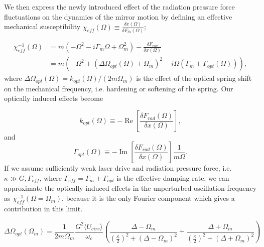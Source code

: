 We then express the newly introduced effect of the radiation pressure force fluctuations on the dynamics of the mirror motion by defining an effective mechanical susceptibility $\chi_{eff}(\Omega) \equiv \frac{\delta x(\Omega)}{\delta F_{th}(\Omega)}$;

\begin{equation}
\begin{split}
\chi_{eff}^{-1}(\Omega) & = m(-\Omega^2 -i\Gamma_m\Omega + \Omega_m^2) - \frac{\delta F_{rad}}{\delta x(\Omega)} \\
 & = m(-\Omega^2 + (\Delta\Omega_{opt}(\Omega) + \Omega_m)^2 -i\Omega(\Gamma_m + \Gamma_{opt}(\Omega))),
\end{split}
\end{equation}
\noindent
where $\Delta\Omega_{opt}(\Omega) = k_{opt}(\Omega)/(2m\Omega_m)$ is the effect of the optical spring shift on the mechanical frequency, i.e. hardening or softening of the spring. Our optically induced effects become

\begin{equation}
k_{opt}(\Omega) \equiv -\operatorname{Re}\left[{\frac{\delta F_{rad}(\Omega)}{\delta x (\Omega)}}\right],
\end{equation}
\noindent
and
\begin{equation}
\Gamma_{opt}(\Omega) \equiv -\operatorname{Im}\left[{\frac{\delta F_{rad}(\Omega)}{\delta x (\Omega)}}\right]\frac{1}{m\Omega}.
\end{equation}
\noindent
If we assume sufficiently weak laser drive and  radiation pressure force, i.e. $\kappa \gg G,\Gamma_{eff}$, where $\Gamma_{eff} = \Gamma_m + \Gamma_{opt}$ is  the effective damping rate, we can approximate the optically induced effects in the unperturbed oscillation frequency as $\chi_{eff}^{-1}(\Omega = \Omega_m)$, because it is the only Fourier component which gives a contribution in this limit.

\begin{equation}
\Delta\Omega_{opt}(\Omega_m) = \frac{1}{2m\Omega_m}\frac{G^2\langle U_{circ} \rangle}{\omega_c}\left( \frac{\Delta - \Omega_m}{\left(\frac{\kappa}{2}\right)^2 + (\Delta - \Omega_m)^2} + \frac{\Delta + \Omega_m}{\left(\frac{\kappa}{2}\right)^2 + (\Delta + \Omega_m)^2} \right)
\end{equation}

